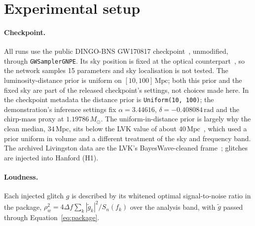 \documentclass{openjournal}
\newcommand{\DINGOBNS}{DINGO-BNS\xspace}
\begin{document}
\section{Experimental setup}
\label{sec:setup}

\paragraph{Checkpoint.}
All runs use the public \DINGOBNS GW170817 checkpoint~\cite{Dax2025bns}, unmodified, through \texttt{GWSampler\-GNPE}.
Its sky position is fixed at the optical counterpart~\cite{Coulter2017sss17a,Abbott2017mma}, so the network samples 15 parameters and sky localisation is not tested.
The luminosity-distance prior is uniform on $[10,100]\,\mathrm{Mpc}$; both this prior and the fixed sky are part of the released checkpoint's settings, not choices made here.
In the checkpoint metadata the distance prior is \texttt{Uniform(10, 100)}; the demonstration's inference settings fix $\alpha=3.44616$, $\delta=-0.408084\,\mathrm{rad}$ and the chirp-mass proxy at $1.19786\,M_\odot$.
The uniform-in-distance prior is largely why the clean median, $34\,\mathrm{Mpc}$, sits below the LVK value of about $40\,\mathrm{Mpc}$~\cite{Abbott2017gw170817}, which used a prior uniform in volume and a different treatment of the sky and frequency band.
The archived Livingston data are the LVK's BayesWave-cleaned frame~\cite{Pankow2018mitigation}; glitches are injected into Hanford (H1).

\paragraph{Loudness.}
Each injected glitch $g$ is described by its whitened optimal signal-to-noise ratio in the package,
$\rho_w^2 = 4\Delta f \sum_k |\tilde g_k|^2/S_n(f_k)$ over the analysis band, with $\tilde g$ passed through Equation~\eqref{eq:package}.
\end{document}
